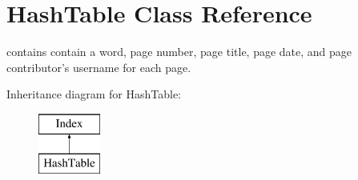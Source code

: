 \hypertarget{class_hash_table}{\section{Hash\-Table Class Reference}
\label{class_hash_table}
}


contains contain a word, page number, page title, page date, and page contributor's username for each page.  


Inheritance diagram for Hash\-Table\-:\begin{figure}[H]
\begin{center}
\leavevmode
\includegraphics[height=2.000000cm]{class_hash_table}
\end{center}
\end{figure}
